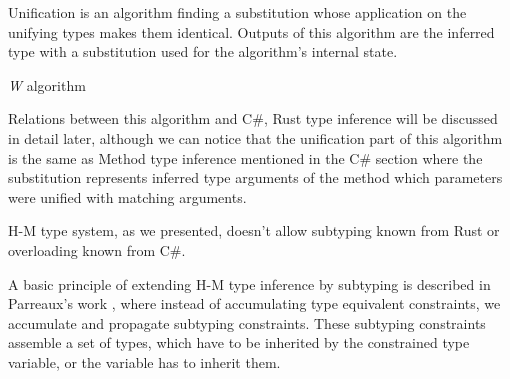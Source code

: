Unification is an algorithm finding a substitution whose application on the unifying types makes them identical. 
Outputs of this algorithm are the inferred type with a substitution used for the algorithm's internal state. 
\par
\begin{algorithm}

\caption{\textit{W} algorithm}
\label{alg05:w}
\end{algorithm}
\par
{}
Relations between this algorithm and C\#, Rust type inference will be discussed in detail later, although we can notice that the unification part of this algorithm is the same as Method type inference mentioned in the C\# section where the substitution represents inferred type arguments of the method which parameters were unified with matching arguments.
\par
{}
H-M type system, as we presented, doesn't allow subtyping known from Rust or overloading known from C\#.  
\par
A basic principle of extending H-M type inference by subtyping is described in Parreaux's work \cite{paper:Parreaux}, where instead of accumulating type equivalent constraints, we accumulate and propagate subtyping constraints.
These subtyping constraints assemble a set of types, which have to be inherited by the constrained type variable, or the variable has to inherit them.
